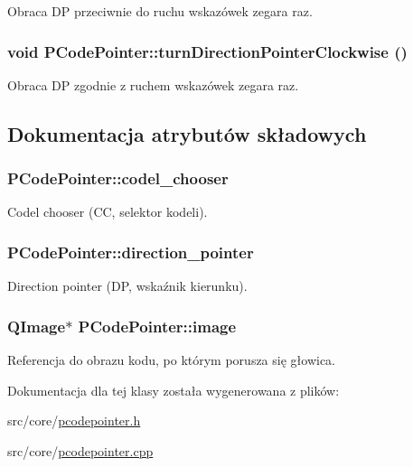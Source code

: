 Obraca DP przeciwnie do ruchu wskazówek zegara raz. \hypertarget{classPCodePointer_a3ad29e6327d54faf0b081892e720aca}{
\subsubsection[{turnDirectionPointerClockwise}]{\setlength{\rightskip}{0pt plus 5cm}void PCodePointer::turnDirectionPointerClockwise ()}}
\label{classPCodePointer_a3ad29e6327d54faf0b081892e720aca}


Obraca DP zgodnie z ruchem wskazówek zegara raz. 

\subsection{Dokumentacja atrybutów składowych}
\hypertarget{classPCodePointer_a3d7ea2563c9e1363ddcb0fb19b35f5a}{
\subsubsection[{codel\_\-chooser}]{ {\bf PCodePointer::codel\_\-chooser}}}
\label{classPCodePointer_a3d7ea2563c9e1363ddcb0fb19b35f5a}


Codel chooser (CC, selektor kodeli). \hypertarget{classPCodePointer_b285be0011b9b5c8b35bd1ba27ee935f}{
\subsubsection[{direction\_\-pointer}]{ {\bf PCodePointer::direction\_\-pointer}}}
\label{classPCodePointer_b285be0011b9b5c8b35bd1ba27ee935f}


Direction pointer (DP, wskaźnik kierunku). \hypertarget{classPCodePointer_9f6689e6425046abd85001f915ba1221}{
\subsubsection[{image}]{\setlength{\rightskip}{0pt plus 5cm}QImage$\ast$ {\bf PCodePointer::image}}}
\label{classPCodePointer_9f6689e6425046abd85001f915ba1221}


Referencja do obrazu kodu, po którym porusza się głowica. 

Dokumentacja dla tej klasy została wygenerowana z plików:\begin{CompactItemize}
\item 
src/core/\hyperlink{pcodepointer_8h}{pcodepointer.h}\item 
src/core/\hyperlink{pcodepointer_8cpp}{pcodepointer.cpp}\end{CompactItemize}
